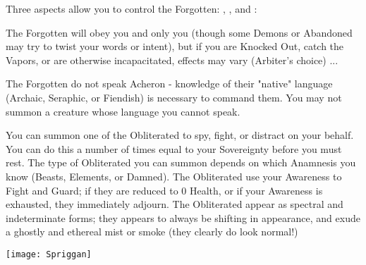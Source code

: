 


Three aspects allow you to control the Forgotten:  , , and :


The Forgotten will obey you and only you (though some Demons or Abandoned may try to twist your words or intent), but if you are Knocked Out, catch the Vapors, or are otherwise incapacitated, effects may vary (Arbiter's choice) ...

The Forgotten do not speak Acheron - knowledge of their "native" language (Archaic, Seraphic, or Fiendish) is necessary to command them.  You may not summon a creature whose language you cannot speak.  

\cbreak


You can summon one of the Obliterated to spy, fight, or distract on your behalf.  You can do this a number of times equal to your Sovereignty before you must rest.  The type of Obliterated you can summon depends on which Anamnesis you know (Beasts, Elements, or Damned).  The Obliterated use your Awareness \UD to Fight and Guard; if they are reduced to 0 Health, or if your Awareness is exhausted, they immediately adjourn. The Obliterated appear as spectral and indeterminate forms; they appears to always be shifting in appearance, and exude a ghostly and ethereal mist or smoke (they clearly do  look normal!)



  \begin{center}
  \texttt{[image: Spriggan]}
  \end{center}


